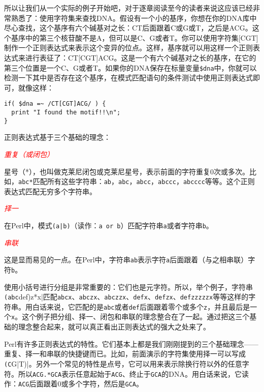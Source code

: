 所以让我们从一个实际的例子开始吧，对于逐章阅读至今的读者来说这应该已经非常熟悉了：使用字符集来查找DNA。假设有一个小的基序，你想在你的DNA库中尽心查找，这个基序有六个碱基对之长：CT后面跟着C或G或T，之后是ACG。这个基序中的第三个核苷酸不是A，但可以是C、G或者T。你可以使用字符集[CGT]制作一个正则表达式来表示这个变异的位点。这样，基序就可以用这样一个正则表达式来进行表征了：CT[CGT]ACG。这是一个有六个碱基对之长的基序，在它的第三个位置是一个C、G或者T。如果你的DNA保存在标量变量\verb|$dna|中，你就可以检测一下其中是否存在这个基序，在模式匹配语句的条件测试中使用正则表达式即可，就像这样：

\begin{lstlisting}
if( $dna =~ /CT[CGT]ACG/ ) {
  print "I found the motif!!\n";
}
\end{lstlisting}

正则表达式基于三个基础的理念：

\textcolor{red}{\textit{重复（或闭包）}}
\begin{adjustwidth}{1cm}{}
星号（*），也叫做克莱尼闭包或克莱尼星号，表示前面的字符重复0次或多次。比如，\verb|abc*|匹配所有这些字符串：\verb|ab|，\verb|abc|，\verb|abcc|，\verb|abccc|，\verb|abcccc|等等。这个正则表达式匹配无穷多个字符串。
\end{adjustwidth}

\textcolor{red}{\textit{择一}}
\begin{adjustwidth}{1cm}{}
在Perl中，模式\verb=(a|b)=（读作：\verb|a or b|）匹配字符串\verb|a|或者字符串\verb|b|。
\end{adjustwidth}

\textcolor{red}{\textit{串联}}
\begin{adjustwidth}{1cm}{}
这是显而易见的一点。在Perl中，字符串\verb|ab|表示字符\verb|a|后面跟着（与之相串联）字符\verb|b|。
\end{adjustwidth}

使用小括号进行分组是非常重要的：它们也是元字符。所以，举个例子，字符串\verb|(abc|def)z*x|匹配\verb|abcx|、\verb|abczx|、\verb|abczzx|、\verb|defx|、\verb|defzx|、\verb|defzzzzzx|等等这样的字符串。用白话来说，它匹配的是\verb|abc|或者\verb|def|后面跟着零个或多个\verb|z|，并且最后是一个\verb|x|。这个例子把分组、择一、闭包和串联的理念整合在了一起。通过把这三个基础的理念整合起来，就可以真正看出正则表达式的强大之处来了。

Perl有许多正则表达式的特性。它们基本上都是我们刚刚提到的三个基础理念——重复、择一和串联的快捷键而已。比如，前面演示的字符集使用择一可以写成\verb|(C|G|T)|。另外一个常见的特性是点号，它可以用来表示除换行符以外的任意字符。所以\verb|ACG.*GCA|表示任意起始于\verb|ACG|、终止于\verb|GCA|的DNA。用白话来说，它读作：\verb|ACG|后面跟着0或多个字符，然后是\verb|GCA|。

